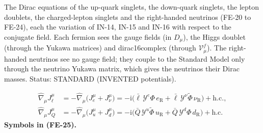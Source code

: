 \documentclass[
  10pt,
]{article}
\begin{document}
The Dirac equations of the up-quark singlets, the down-quark singlets,
the lepton doublets, the charged-lepton singlets and the right-handed
neutrinos (FE-20 to FE-24), each the variation of IN-14, IN-15 and IN-16
with respect to the conjugate field. Each fermion sees the gauge fields
(in \(D_\mu\)), the Higgs doublet (through the Yukawa matrices) and
dirac16complex (through \(\mathcal{V}^{f}_\mu\)). The right-handed
neutrinos see no gauge field; they couple to the Standard Model only
through the neutrino Yukawa matrix, which gives the neutrinos their
Dirac masses. Status: STANDARD (INVENTED potentials).

\[
\begin{aligned}
\hat\nabla_\mu J_{\ell}^\mu &= -\hat\nabla_\mu\big(J_{e}^\mu + J_{\nu}^\mu\big)
 = -\mathrm{i}\big(\bar\ell\,\mathcal{Y}^{e}\Phi\,e_{\mathrm{R}} + \bar\ell\,\mathcal{Y}^{\nu}\tilde\Phi\,\nu_{\mathrm{R}}\big) + \mathrm{h.c.},\\
\hat\nabla_\mu J_{Q}^\mu &= -\hat\nabla_\mu\big(J_{u}^\mu + J_{d}^\mu\big)
 = -\mathrm{i}\big(\bar Q\,\mathcal{Y}^{u}\tilde\Phi\,u_{\mathrm{R}} + \bar Q\,\mathcal{Y}^{d}\Phi\,d_{\mathrm{R}}\big) + \mathrm{h.c.}
\end{aligned} \tag{FE-25}
\] \textbf{Symbols in (FE-25).}
\end{document}
